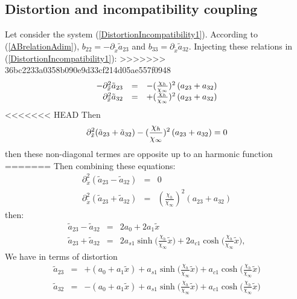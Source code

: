 \documentclass[
10pt, %
a4paper, %
oneside, %
headinclude,footinclude, %
table
]{scrartcl}
\begin{document}
\begin{itemize}
\subsection{Distortion and incompatibility coupling}
Let consider the system (\ref{DistortionIncompatibility1}). According to (\ref{ABrelationAdim}), $b_{22}=-\partial_{\tilde{x}}\tilde{a}_{23}$ and $b_{33}=\partial_{\tilde{x}}\tilde{a}_{32}$. Injecting these relations in (\ref{DistortionIncompatibility1}):
>>>>>>> 36bc2233a0358b090e9d33cf214d05ae557f0948
\begin{equation}\label{DistortionIncompatibility2}
\begin{array}{rcl}
-\partial_{\tilde{x}}^2\tilde{a}_{23}&=&-(\frac{\chi_{h}}{\chi_{\infty}})^2\left(a_{23}+a_{32}\right)\\
\partial_{\tilde{x}}^2\tilde{a}_{32}&=&+(\frac{\chi_{h}}{\chi_{\infty}})^2\left(a_{23}+a_{32}\right)
\end{array}
\end{equation}
<<<<<<< HEAD
Then 
$$
\partial_{\tilde{x}}^2(\tilde{a}_{23}+\tilde{a}_{32})-(\frac{\chi_{h}}{\chi_{\infty}})^2\left(a_{23}+a_{32}\right)=0
$$
then these non-diagonal termes are opposite up to an harmonic function 
=======
Then combining these equations:
\begin{equation}
\begin{array}{rcl}
\partial_{\tilde{x}}^2(\tilde{a}_{23}-\tilde{a}_{32})&=&0\\
\partial_{\tilde{x}}^2(\tilde{a}_{23}+\tilde{a}_{32})&=&(\frac{\chi_{h}}{\chi_{\infty}})^2\left(a_{23}+a_{32}\right)
\end{array}
\end{equation}
then: 
\begin{equation}
\begin{array}{rcl}
\tilde{a}_{23}-\tilde{a}_{32}&=&2a_{0}+2a_{1}\tilde{x}
\\
\tilde{a}_{23}+\tilde{a}_{32}&=&2a_{s1}\sinh{(\frac{\chi_{h}}{\chi_{\infty}}\tilde{x}})+2a_{c1}\cosh{(\frac{\chi_{h}}{\chi_{\infty}}\tilde{x}}),
\end{array}
\end{equation}
We have in terms of distortion
\begin{equation}
\begin{array}{rcl}
\tilde{a}_{23}&=&+(a_{0}+a_{1}\tilde{x})+a_{s1}\sinh{(\frac{\chi_{h}}{\chi_{\infty}}\tilde{x}})+a_{c1}\cosh{(\frac{\chi_{h}}{\chi_{\infty}}\tilde{x}})
\\
\tilde{a}_{32}&=&-(a_{0}+a_{1}\tilde{x})+a_{s1}\sinh{(\frac{\chi_{h}}{\chi_{\infty}}\tilde{x}})+a_{c1}\cosh{(\frac{\chi_{h}}{\chi_{\infty}}\tilde{x}})

\end{array}
\end{equation}
\end{itemize}
\end{document}
